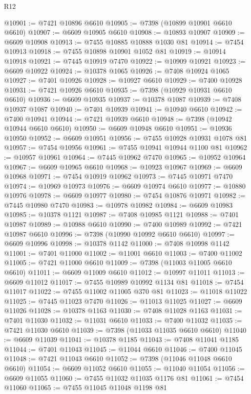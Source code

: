 \begin{lexlean}{R12}
\begin{coremodule}
{{{{{{{{{{{{{{{{{{{{{{{{{{{{{{{{{{{{{{{{{{{{{{{{{{{{{{{{{{{{{{{{{{{{{{{{{{{{{{{{{{@10901 := @7421 @10896 @6610
@10905 := @7398 (@10899 @10901 @6610 @6610)
@10907 := @6609 @10905 @6610
@10908 := @10893 @10907
@10909 := @6609 @10908
@10913 := @7455 @10885 @10888 @1030 @81
@10914 := @7454 @10913
@10918 := @7455 @10898 @10901 @1052 @81
@10919 := @10914 @10918
@10921 := @7445 @10919 @7470
@10922 := @10909 @10921
@10923 := @6609 @10922
@10924 := @10378 @1065
@10926 := @7408 @10924 @1065
@10927 := @7401 @10926
@10928 := @10927 @6610
@10929 := @7400 @10928
@10931 := @7421 @10926 @6610
@10935 := @7398 (@10929 @10931 @6610 @6610)
@10936 := @6609 @10935
@10937 := @10378 @1087
@10939 := @7408 @10937 @1087
@10940 := @7401 @10939
@10941 := @10940 @6610
@10942 := @7400 @10941
@10944 := @7421 @10939 @6610
@10948 := @7398 (@10942 @10944 @6610 @6610)
@10950 := @6609 @10948 @6610
@10951 := @10936 @10950
@10952 := @6609 @10951
@10956 := @7455 @10928 @10931 @1078 @81
@10957 := @7454 @10956
@10961 := @7455 @10941 @10944 @1100 @81
@10962 := @10957 @10961
@10964 := @7445 @10962 @7470
@10965 := @10952 @10964
@10967 := @6609 @10965 @6610
@10968 := @10923 @10967
@10969 := @6609 @10968
@10971 := @7454 @10919 @10962
@10973 := @7445 @10971 @7470
@10974 := @10969 @10973
@10976 := @6609 @10974 @6610
@10977 := @10880 @10976
@10978 := @6609 @10977
@10980 := @7454 @10876 @10971
@10982 := @7445 @10980 @7470
@10983 := @10978 @10982
@10984 := @6609 @10983
@10985 := @10378 @1121
@10987 := @7408 @10985 @1121
@10988 := @7401 @10987
@10989 := @10988 @6610
@10990 := @7400 @10989
@10992 := @7421 @10987 @6610
@10996 := @7398 (@10990 @10992 @6610 @6610)
@10997 := @6609 @10996
@10998 := @10378 @1142
@11000 := @7408 @10998 @1142
@11001 := @7401 @11000
@11002 := @11001 @6610
@11003 := @7400 @11002
@11005 := @7421 @11000 @6610
@11009 := @7398 (@11003 @11005 @6610 @6610)
@11011 := @6609 @11009 @6610
@11012 := @10997 @11011
@11013 := @6609 @11012
@11017 := @7455 @10989 @10992 @1134 @81
@11018 := @7454 @11017
@11022 := @7455 @11002 @11005 @370 @81
@11023 := @11018 @11022
@11025 := @7445 @11023 @7470
@11026 := @11013 @11025
@11027 := @6609 @11026
@11028 := @10378 @1163
@11030 := @7408 @11028 @1163
@11031 := @7401 @11030
@11032 := @11031 @6610
@11033 := @7400 @11032
@11035 := @7421 @11030 @6610
@11039 := @7398 (@11033 @11035 @6610 @6610)
@11040 := @6609 @11039
@11041 := @10378 @1185
@11043 := @7408 @11041 @1185
@11044 := @7401 @11043
@11045 := @11044 @6610
@11046 := @7400 @11045
@11048 := @7421 @11043 @6610
@11052 := @7398 (@11046 @11048 @6610 @6610)
@11054 := @6609 @11052 @6610
@11055 := @11040 @11054
@11056 := @6609 @11055
@11060 := @7455 @11032 @11035 @1176 @81
@11061 := @7454 @11060
@11065 := @7455 @11045 @11048 @1198 @81
}}}}}}}}}}}}}}}}}}}}}}}}}}}}}}}}}}}}}}}}}}}}}}}}}}}}}}}}}}}}}}}}}}}}}}}}}}}}}}}}}}
\end{coremodule}
\end{lexlean}
